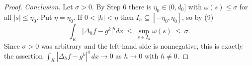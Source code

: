 \begin{proof}
\emph{Conclusion.}  Let $\sigma>0$.  By Step 6 there is $\eta_0\in(0,d_0]$ with
$\omega(s)\le\sigma$ for all $|s|\le\eta_0$.  Put $\eta=\eta_0$.  If
$0<|h|<\eta$ then $I_h\subseteq[-\eta_0,\eta_0]$, so by (9)
\[
\int_K\bigl|\Delta_hf-g^k\bigr|^qdx\ \le\ \sup_{s\in I_h}\omega(s)\ \le\ \sigma .
\]
Since $\sigma>0$ was arbitrary and the left-hand side is nonnegative, this is
exactly the assertion
$\int_K|\Delta_hf-g^k|^q\,dx\to0$ as $h\to0$ with $h\ne0$.
\end{proof}
